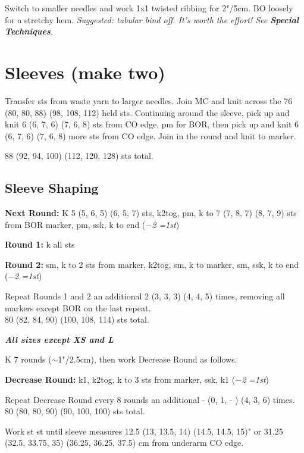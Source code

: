 \documentclass[12pt]{article}
\newcommand{\vocab}[1]{\emph{\textbf{#1}}} %
\newcommand{\rowDir}[1]{\textbf{#1:}} %
\newcommand{\decrease}[1]{(\emph{$-$#1
	\ifnum#1=1{st}\else{sts}\fi})}
\newenvironment{frnote}
    {%
    	\setlength{\FrameRule}{1.5pt}
    	\def\FrameCommand{\fboxrule=\FrameRule\fboxsep=\FrameSep \fcolorbox{framecolor}{shadecolor}}
    	\MakeFramed {\FrameRestore}}
    {\setlength{\FrameRule}{1pt}
	\endMakeFramed}
\begin{document}
\begin{multicols}{2}
Switch to smaller needles and work 1x1 twisted ribbing for 2"/5cm. BO loosely for a stretchy hem. \emph{Suggested: tubular bind off. It's worth the effort! See \textbf{Special Techniques}.}


\section*{Sleeves (make two)}

Transfer sts from waste yarn to larger needles. Join MC and knit across the 
76 (80, 80, 88) (98, 108, 112) held sts. Continuing around the sleeve, pick up and knit 
6 (6, 7, 6) (7, 6, 8) sts from CO edge, pm for BOR, then pick up and knit 
6 (6, 7, 6) (7, 6, 8) more sts from CO edge. Join in the round and knit to marker.

88 (92, 94, 100) (112, 120, 128) sts total.

\subsection*{Sleeve Shaping}

\rowDir{Next Round} K 5 (5, 6, 5) (6, 5, 7) sts, k2tog, pm, k to 
7 (7, 8, 7) (8, 7, 9) sts from BOR marker, pm, ssk, k to end \decrease{2}

\rowDir{Round 1} k all sts

\rowDir{Round 2} sm, k to 2 sts from marker, k2tog, sm, k to marker, sm, ssk, k to end \\ \decrease{2}

Repeat Rounds 1 and 2 an additional 2 (3, 3, 3) (4, 4, 5) times, removing all markers except BOR on the last repeat. \\
80 (82, 84, 90) (100, 108, 114) sts total. %

\begin{frnote}
\vocab{All sizes except XS and L}

K 7 rounds ($\sim$1"/2.5cm), then work Decrease Round as follows.

\rowDir{Decrease Round} k1, k2tog, k to 3 sts from marker, ssk, k1 \decrease{2}

Repeat Decrease Round every 8 rounds an additional - (0, 1, - ) (4, 3, 6) times. 80 (80, 80, 90) (90, 100, 100) sts total. %
\end{frnote}

Work st st until sleeve measures 
12.5 (13, 13.5, 14) (14.5, 14.5, 15)" or
31.25 (32.5, 33.75, 35) (36.25, 36.25, 37.5) cm from underarm CO edge. 


\end{multicols}
\end{document}
